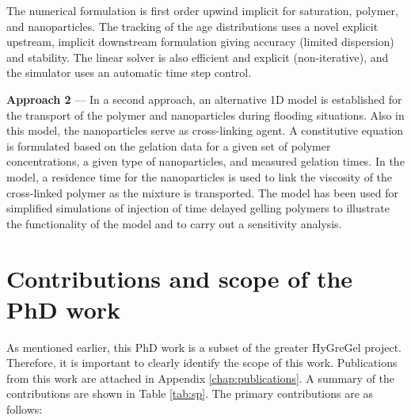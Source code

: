 The numerical formulation is first order upwind implicit for saturation, polymer, and nanoparticles. The tracking of the age distributions uses a novel explicit upstream, implicit downstream formulation giving accuracy (limited dispersion) and stability. The linear solver is also efficient and explicit (non-iterative), and the simulator uses an automatic time step control. 

\textbf{Approach 2} --- In a second approach, an alternative 1D model is established for the transport of the polymer and nanoparticles during flooding situations. Also in this model, the nanoparticles serve as cross-linking agent. A constitutive equation is formulated based on the gelation data for a given set of polymer concentrations, a given type of nanoparticles, and measured gelation times. In the model, a residence time for the nanoparticles is used to link the viscosity of the cross-linked polymer as the mixture is transported. The model has been used for simplified simulations of injection of time delayed gelling polymers to illustrate the functionality of the model and to carry out a sensitivity analysis.

\section{Contributions and scope of the PhD work}

As mentioned earlier, this PhD work is a subset of the greater HyGreGel project. Therefore, it is important to clearly identify the scope of this work. Publications from this work are attached in Appendix \ref{chap:publications}. A summary of the contributions are shown in Table \ref{tab:sp}. The primary contributions are as follows:

